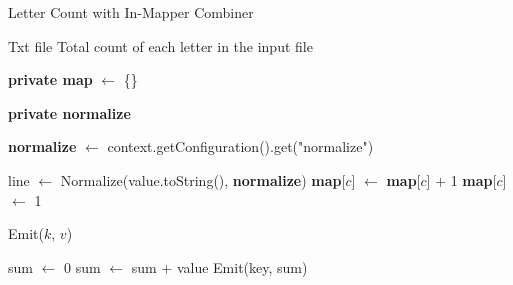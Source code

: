 \begin{algorithm}[H]
    \caption{Letter Count with In-Mapper Combiner}
    \begin{algorithmic}[1]
    \Require Txt file
    \Ensure Total count of each letter in the input file
    
    \Statex
    
        \State \textbf{private map} $\leftarrow$ \{\}
        
        \State \textbf{private normalize}
    
            \State \textbf{normalize} $\leftarrow$ context.getConfiguration().get("normalize")
        \EndProcedure
    
            \State line $\leftarrow$ Normalize(value.toString(), \textbf{normalize})
                        \State \textbf{map}[$c$] $\leftarrow$ \textbf{map}[$c$] + 1
                    \Else
                        \State \textbf{map}[$c$] $\leftarrow$ 1
                    \EndIf
                \EndIf
            \EndFor
        \EndProcedure
    
                \State Emit($k$, $v$)
            \EndFor
        \EndProcedure
    \EndClass
    
    \Statex
    
            \State sum $\leftarrow$ 0
                \State sum $\leftarrow$ sum + value
            \EndFor
            \State Emit(key, sum)
        \EndProcedure
    \EndClass
    \end{algorithmic}
    \end{algorithm}
    
